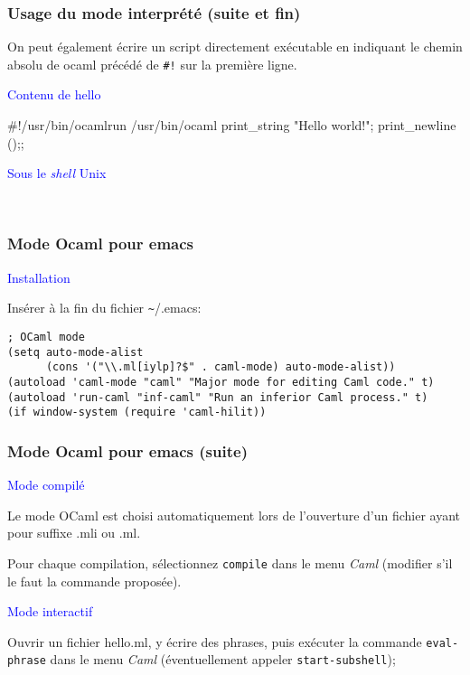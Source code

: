 %
\begin{frame}[containsverbatim]
\frametitle{Usage du mode interprété (suite et fin)}

On peut également écrire un script directement exécutable en indiquant
le chemin absolu de \textsf{ocaml} précédé de \texttt{\#!} sur la
première ligne.

\textcolor{blue}{Contenu de \textsf{hello}}

\begin{semiverbatim}
#!/usr/bin/ocamlrun /usr/bin/ocaml
print_string "Hello world!"; print_newline ();;
\end{semiverbatim}

\textcolor{blue}{Sous le \emph{shell} Unix}

\\

\end{frame}

%
\begin{frame}[containsverbatim]
\frametitle{Mode Ocaml pour \textsf{emacs}}

\textcolor{blue}{Installation}

Insérer à la fin du fichier \verb+~+\textsf{/.emacs}:

\begin{verbatim}
; OCaml mode
(setq auto-mode-alist
      (cons '("\\.ml[iylp]?$" . caml-mode) auto-mode-alist))
(autoload 'caml-mode "caml" "Major mode for editing Caml code." t)
(autoload 'run-caml "inf-caml" "Run an inferior Caml process." t)
(if window-system (require 'caml-hilit))
\end{verbatim}

\end{frame}

%
\begin{frame}
\frametitle{Mode Ocaml pour \textsf{emacs} (suite)}

\textcolor{blue}{Mode compilé}

Le mode OCaml est choisi automatiquement lors de l'ouverture d'un
fichier ayant pour suffixe \textsf{.mli} ou \textsf{.ml}.

Pour chaque compilation, sélectionnez \texttt{compile} dans le menu
\textsl{Caml} (modifier s'il le faut la commande proposée).

\textcolor{blue}{Mode interactif}

Ouvrir un fichier \textsf{hello.ml}, y écrire des phrases, puis
exécuter la commande \texttt{eval-phrase} dans le menu \textsl{Caml}
(éventuellement appeler \texttt{start-subshell});

\end{frame}


